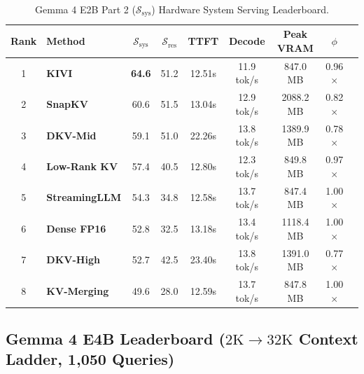 \documentclass[10pt]{article}
\theoremstyle{definition}
\begin{document}
\begin{table}[h]
\vspace{6pt}
\centering
\small
\caption{Gemma 4 E2B Part 2 ($\mathcal{S}_{\text{sys}}$) Hardware System Serving Leaderboard.}
\label{tab:e2b_ssys}
\begin{tabular}{clccccccc}
\toprule
\textbf{Rank} & \textbf{Method} & $\mathcal{S}_{\text{sys}}$ & $\mathcal{S}_{\text{res}}$ & \textbf{TTFT} & \textbf{Decode} & \textbf{Peak VRAM} & $\phi$ \\
\midrule
1 & \textbf{KIVI} & \textbf{64.6} & 51.2 & 12.51s & 11.9 tok/s & 847.0 MB & 0.96$\times$ \\
2 & \textbf{SnapKV} & 60.6 & 51.5 & 13.04s & 12.9 tok/s & 2088.2 MB & 0.82$\times$ \\
3 & \textbf{DKV-Mid} & 59.1 & 51.0 & 22.26s & 13.8 tok/s & 1389.9 MB & 0.78$\times$ \\
4 & \textbf{Low-Rank KV} & 57.4 & 40.5 & 12.80s & 12.3 tok/s & 849.8 MB & 0.97$\times$ \\
5 & \textbf{StreamingLLM} & 54.3 & 34.8 & 12.58s & 13.7 tok/s & 847.4 MB & 1.00$\times$ \\
6 & \textbf{Dense FP16} & 52.8 & 32.5 & 13.18s & 13.4 tok/s & 1118.4 MB & 1.00$\times$ \\
7 & \textbf{DKV-High} & 52.7 & 42.5 & 23.40s & 13.8 tok/s & 1391.0 MB & 0.77$\times$ \\
8 & \textbf{KV-Merging} & 49.6 & 28.0 & 12.59s & 13.7 tok/s & 847.8 MB & 1.00$\times$ \\
\bottomrule
\end{tabular}
\end{table}

\clearpage
\subsection{Gemma 4 E4B Leaderboard (\texorpdfstring{$2\text{K} \to 32\text{K}$}{2K to 32K} Context Ladder, 1,050 Queries)}
\end{document}
